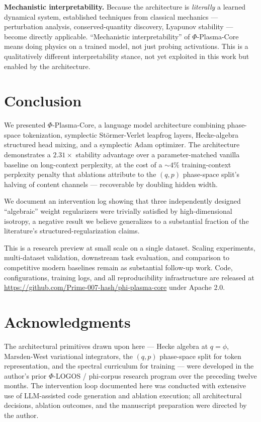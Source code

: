 \documentclass[11pt]{article}
\newcommand{\phigold}{\phi}
\begin{document}
\textbf{Mechanistic interpretability.} Because the architecture is
\emph{literally} a learned dynamical system, established techniques from
classical mechanics --- perturbation analysis, conserved-quantity
discovery, Lyapunov stability --- become directly applicable.
``Mechanistic interpretability'' of $\Phi$-Plasma-Core means doing
physics on a trained model, not just probing activations. This is a
qualitatively different interpretability stance, not yet exploited in
this work but enabled by the architecture.

\section{Conclusion}
\label{sec:conclusion}

We presented $\Phi$-Plasma-Core, a language model architecture
combining phase-space tokenization, symplectic Störmer-Verlet leapfrog
layers, Hecke-algebra structured head mixing, and a symplectic Adam
optimizer. The architecture demonstrates a $2.31\times$ stability
advantage over a parameter-matched vanilla baseline on long-context
perplexity, at the cost of a $\sim 4\%$ training-context perplexity
penalty that ablations attribute to the $(q, p)$ phase-space split's
halving of content channels --- recoverable by doubling hidden width.

We document an intervention log showing that three independently
designed ``algebraic'' weight regularizers were trivially satisfied
by high-dimensional isotropy, a negative result we believe generalizes
to a substantial fraction of the literature's structured-regularization
claims.

This is a research preview at small scale on a single dataset.
Scaling experiments, multi-dataset validation, downstream task
evaluation, and comparison to competitive modern baselines remain as
substantial follow-up work. Code, configurations, training logs, and
all reproducibility infrastructure are released at
\url{https://github.com/Prime-007-hash/phi-plasma-core} under
Apache 2.0.

\section*{Acknowledgments}

The architectural primitives drawn upon here --- Hecke algebra at
$q = \phigold$, Marsden-West variational integrators, the $(q, p)$
phase-space split for token representation, and the spectral curriculum
for training --- were developed in the author's prior
$\Phi$-LOGOS / phi-corpus research program over the preceding twelve
months. The intervention loop documented here was conducted with
extensive use of LLM-assisted code generation and ablation execution;
all architectural decisions, ablation outcomes, and the manuscript
preparation were directed by the author.
\end{document}
